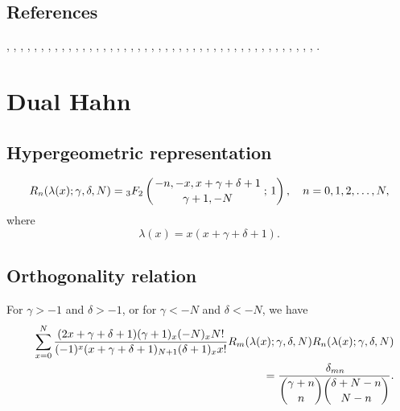\documentclass[envcountchap,graybox]{svmono}
\newcommand{\hyp}[5]{\mbox{}_{#1}{F}_{#2}
\left(\genfrac{}{}{0pt}{}{#3}{#4}\,;\,#5\right)}
\begin{document}
\subsection*{References}
\cite{AlSalam90}, \cite{AndrewsAskey85}, \cite{Area+II}, \cite{Askey75},
\cite{Askey89I}, \cite{Askey2005}, \cite{AskeyGasper77}, \cite{AskeyWilson85},
\cite{AtakRahmanSuslov}, \cite{AtakSuslov88}, \cite{Chihara78},
\cite{Ciesielski}, \cite{Cooper+}, \cite{Dette95}, \cite{Dunkl76},
\cite{Dunkl78I}, \cite{Gasper73I}, \cite{Gasper74}, \cite{HoareRahman},
\cite{Ismail77}, \cite{Ismail2005II}, \cite{Karlin61}, \cite{Koorn81}, \cite{Koorn88},
\cite{LabelleYehI}, \cite{LabelleYehII}, \cite{Laine}, \cite{Lesky62},
\cite{Lesky88}, \cite{Lesky89}, \cite{Lesky94I}, \cite{Lesky95II},
\cite{LewanowiczII}, \cite{Neuman}, \cite{Nikiforov+}, \cite{NikiforovUvarov},
\cite{Rahman76III}, \cite{Rahman78I}, \cite{Rahman78II}, \cite{Rahman81III},
\cite{Sablonniere}, \cite{Stanton84}, \cite{Stanton90}, \cite{Wilson80}, \cite{Wilson70II},
\cite{Zarzo+}.


\section{Dual Hahn}

\par\setcounter{equation}{0}

\subsection*{Hypergeometric representation}
\begin{equation}
\label{DefDualHahn}
R_n(\lambda(x);\gamma,\delta,N)=
\hyp{3}{2}{-n,-x,x+\gamma+\delta+1}{\gamma+1,-N}{1},\quad n=0,1,2,\ldots,N,
\end{equation}
where
$$\lambda(x)=x(x+\gamma+\delta+1).$$

\subsection*{Orthogonality relation}
For $\gamma>-1$ and $\delta>-1$, or for $\gamma<-N$ and $\delta<-N$, we have
\begin{eqnarray}
\label{OrtDualHahn}
& &\sum_{x=0}^N\frac{(2x+\gamma+\delta+1)(\gamma+1)_x(-N)_xN!}{(-1)^x(x+\gamma+\delta+1)_{N+1}(\delta+1)_xx!}
R_m(\lambda(x);\gamma,\delta,N)R_n(\lambda(x);\gamma,\delta,N)\nonumber\\
& &{}=\frac{\,\delta_{mn}}{\dbinom{\gamma+n}{n}\dbinom{\delta+N-n}{N-n}}.
\end{eqnarray}
\end{document}
